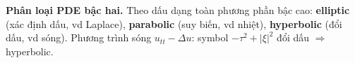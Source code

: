 \textbf{Phân loại PDE bậc hai.}
Theo dấu dạng toàn phương phần bậc cao: \textbf{elliptic} (xác định dấu, vd Laplace), \textbf{parabolic} (suy biến, vd nhiệt), \textbf{hyperbolic} (đổi dấu, vd sóng).
Phương trình sóng $u_{tt}-\Delta u$: symbol $-\tau^2+|\xi|^2$ đổi dấu $\Rightarrow$ hyperbolic.
